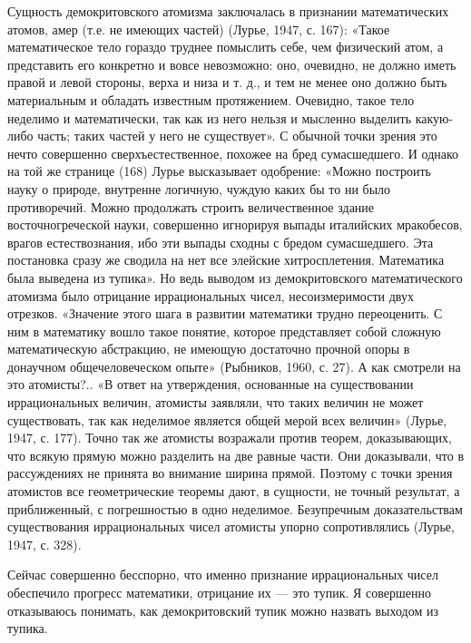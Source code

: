 Сущность    демокритовского   атомизма    заключалась   в    признании
математических атомов, амер (т.е. не  имеющих частей) (Лурье, 1947, с.
167): «Такое  математическое тело гораздо труднее  помыслить себе, чем
физический атом, а представить его  конкретно и вовсе невозможно: оно,
очевидно, не  должно иметь правой и  левой стороны, верха и  низа и т.
д., и тем  не менее оно должно быть материальным  и обладать известным
протяжением. Очевидно, такое тело неделимо и математически, так как из
него  нельзя и  мысленно  выделить какую-либо  часть;  таких частей  у
него  не существует».  С  обычной точки  зрения  это нечто  совершенно
сверхъестественное, похожее на  бред сумасшедшего. И однако  на той же
странице (168)  Лурье высказывает одобрение: «Можно  построить науку о
природе, внутренне логичную, чуждую каких  бы то ни было противоречий.
Можно  продолжать  строить   величественное  здание  восточногреческой
науки,  совершенно  игнорируя  выпады  италийских  мракобесов,  врагов
естествознания,  ибо  эти выпады  сходны  с  бредом сумасшедшего.  Эта
постановка  сразу  же  сводила  на нет  все  элейские  хитросплетения.
Математика   была   выведена   из   тупика».  Но   ведь   выводом   из
демокритовского математического атомизма было отрицание иррациональных
чисел, несоизмеримости двух отрезков.  «Значение этого шага в развитии
математики трудно переоценить. С ним в математику вошло такое понятие,
которое  представляет  собой  сложную  математическую  абстракцию,  не
имеющую достаточно  прочной опоры в донаучном  общечеловеческом опыте»
(Рыбников, 1960,  с. 27). А как  смотрели на это атомисты?..  «В ответ
на  утверждения, основанные  на существовании  иррациональных величин,
атомисты заявляли,  что таких величин  не может существовать,  так как
неделимое является  общей мерой всех  величин» (Лурье, 1947,  с. 177).
Точно  так  же атомисты  возражали  против  теорем, доказывающих,  что
всякую прямую можно разделить на две равные части. Они доказывали, что
в рассуждениях не  принята во внимание ширина прямой.  Поэтому с точки
зрения  атомистов  все геометрические  теоремы  дают,  в сущности,  не
точный  результат, а  приближенный, с  погрешностью в  одно неделимое.
Безупречным   доказательствам   существования   иррациональных   чисел
атомисты упорно сопротивлялись (Лурье, 1947, с. 328).

Сейчас  совершенно  бесспорно,  что  именно  признание  иррациональных
чисел  обеспечило прогресс  математики,  отрицание их  --- это  тупик.
Я  совершенно отказываюсь  понимать,  как  демокритовский тупик  можно
назвать выходом из тупика.

